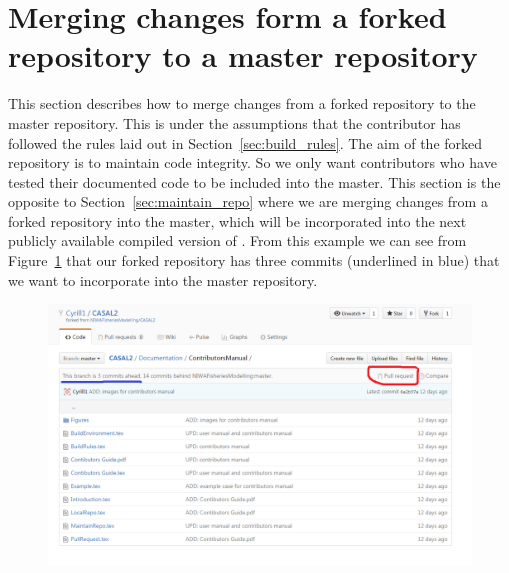 \section{Merging changes form a forked repository to a master repository\label{sec:pull_requests}}

This section describes how to merge changes from a forked repository to the master repository. This is under the assumptions that the contributor has followed the rules laid out in Section~\ref{sec:build_rules}. The aim of the forked repository is to maintain code integrity. So we only want contributors who have tested {\color{red}their} documented code to be included into the master. This section is the opposite to Section~\ref{sec:maintain_repo} where we are merging changes from a forked repository into the master, which will be incorporated into the next publicly available compiled version of \CNAME. From this example we can see from Figure~\ref{fig:fork_merge} that our forked repository has three commits (underlined in blue) that we want to incorporate into the master repository.

\begin{figure}[!ht]
	\includegraphics[scale=0.6]{Figures/Pull_request0.png}
	\caption{}\label{fig:fork_merge}
\end{figure}

